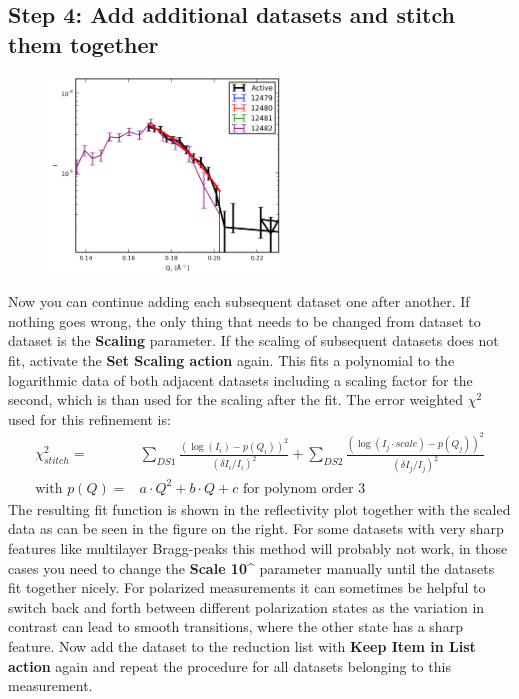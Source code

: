   \subsection{Step 4: Add additional datasets and stitch them together}
    \begin{figure}
    \centering
     \includegraphics[width=175pt]{screenshots/stitching1.png} 
    \end{figure}
    Now you can continue adding each subsequent dataset one after another.
    If nothing goes wrong, the only thing that needs to be changed from dataset to dataset is the \textbf{Scaling} parameter.
    If the scaling of subsequent datasets does not fit, activate the \textbf{Set Scaling action}  again. 
    This fits a polynomial to the logarithmic data of both adjacent datasets including a scaling factor for the second, which is than used for the scaling after the fit.
    The error weighted $\chi^2$ used for this refinement is:
    \begin{eqnarray*}
      \chi_{stitch}^2 =& \underset{DS1}{\sum} \frac{(\log(I_i)-p(Q_i))^2}{(\delta{}I_i/I_i)^2} + \underset{DS2}{\sum} \frac{(\log(I_j\cdot scale)-p(Q_j))^2}{(\delta{}I_j/I_j)^2} \\
      \text{with } p(Q) =& a\cdot Q^2 + b\cdot Q +c \text{ for polynom order 3}
    \end{eqnarray*}
    The resulting fit function is shown in the reflectivity plot together with the scaled data as can be seen in the figure on the right.
    For some datasets with very sharp features like multilayer Bragg-peaks this method will probably not work, in those cases you need to change the \textbf{Scale 10\^} parameter manually until the datasets fit together nicely.
    For polarized measurements it can sometimes be helpful to switch back and forth between different polarization states as the variation in contrast can lead to smooth transitions, where the other state has a sharp feature.
    Now add the dataset to the reduction list with \textbf{Keep Item in List action}  again and repeat the procedure for all datasets belonging to this measurement.


